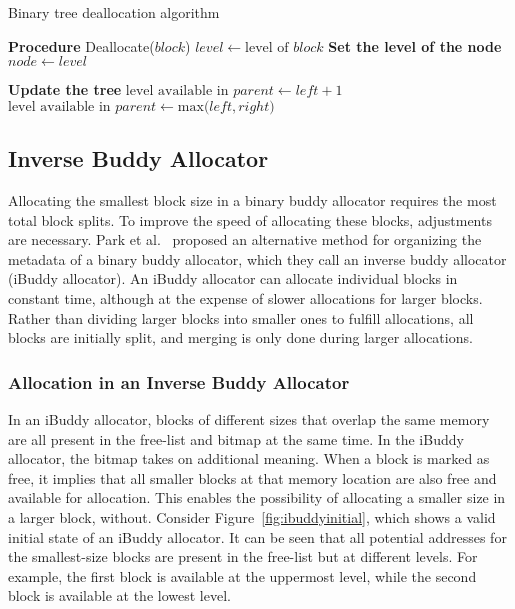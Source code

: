 \begin{algorithm}
  \caption{Binary tree deallocation algorithm}
  \label{alg:btbuddy_dealloc}
  \begin{algorithmic}[1]
    \Statex \textbf{Procedure} Deallocate($block$)
    \State $level \gets \text{level of } block$
    \Statex \textbf{Set the level of the node}
    \State $node \gets level$

    \Statex \textbf{Update the tree}
    \State $\text{level available in } parent \gets left + 1$
    \Else
    \State $\text{level available in } parent \gets \text{max(}left,right\text{)}$
    \EndIf
    \EndFor
  \end{algorithmic}
\end{algorithm}

\subsection{Inverse Buddy Allocator}
Allocating the smallest block size in a binary buddy allocator requires the most total block splits. To improve the speed of allocating these blocks, adjustments are necessary. Park et al.~\cite{park2014ibuddy} proposed an alternative method for organizing the metadata of a binary buddy allocator, which they call an inverse buddy allocator (iBuddy allocator). An iBuddy allocator can allocate individual blocks in constant time, although at the expense of slower allocations for larger blocks. Rather than dividing larger blocks into smaller ones to fulfill allocations, all blocks are initially split, and merging is only done during larger allocations.

\subsubsection{Allocation in an Inverse Buddy Allocator}
In an iBuddy allocator, blocks of different sizes that overlap the same memory are all present in the free-list and bitmap at the same time. In the iBuddy allocator, the bitmap takes on additional meaning. When a block is marked as free, it implies that all smaller blocks at that memory location are also free and available for allocation. This enables the possibility of allocating a smaller size in a larger block, without. Consider Figure~\ref{fig:ibuddyinitial}, which shows a valid initial state of an iBuddy allocator. It can be seen that all potential addresses for the smallest-size blocks are present in the free-list but at different levels. For example, the first block is available at the uppermost level, while the second block is available at the lowest level.


